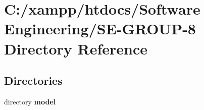 \section{C\+:/xampp/htdocs/\+Software Engineering/\+S\+E-\/\+G\+R\+O\+U\+P-\/8 Directory Reference}
\label{dir_7efd8b761386474408fe354feae392aa}
\subsection*{Directories}
\begin{DoxyCompactItemize}
\item 
directory {\bf model}
\end{DoxyCompactItemize}
